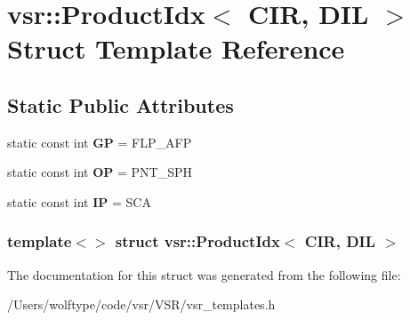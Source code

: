 \hypertarget{structvsr_1_1_product_idx_3_01_c_i_r_00_01_d_i_l_01_4}{\section{vsr\-:\-:Product\-Idx$<$ C\-I\-R, D\-I\-L $>$ Struct Template Reference}
\label{structvsr_1_1_product_idx_3_01_c_i_r_00_01_d_i_l_01_4}
}
\subsection*{Static Public Attributes}
\begin{DoxyCompactItemize}
\item 
\hypertarget{structvsr_1_1_product_idx_3_01_c_i_r_00_01_d_i_l_01_4_a5d62ef0ded2758e28f14ee631173012b}{static const int {\bfseries G\-P} = F\-L\-P\-\_\-\-A\-F\-P}\label{structvsr_1_1_product_idx_3_01_c_i_r_00_01_d_i_l_01_4_a5d62ef0ded2758e28f14ee631173012b}

\item 
\hypertarget{structvsr_1_1_product_idx_3_01_c_i_r_00_01_d_i_l_01_4_a6ee5c174a878403e2877389b5078c24b}{static const int {\bfseries O\-P} = P\-N\-T\-\_\-\-S\-P\-H}\label{structvsr_1_1_product_idx_3_01_c_i_r_00_01_d_i_l_01_4_a6ee5c174a878403e2877389b5078c24b}

\item 
\hypertarget{structvsr_1_1_product_idx_3_01_c_i_r_00_01_d_i_l_01_4_addaf7f750bec53087f3aa2ebf6bc46a3}{static const int {\bfseries I\-P} = S\-C\-A}\label{structvsr_1_1_product_idx_3_01_c_i_r_00_01_d_i_l_01_4_addaf7f750bec53087f3aa2ebf6bc46a3}

\end{DoxyCompactItemize}
\subsubsection*{template$<$$>$ struct vsr\-::\-Product\-Idx$<$ C\-I\-R, D\-I\-L $>$}



The documentation for this struct was generated from the following file\-:\begin{DoxyCompactItemize}
\item 
/\-Users/wolftype/code/vsr/\-V\-S\-R/vsr\-\_\-templates.\-h\end{DoxyCompactItemize}
